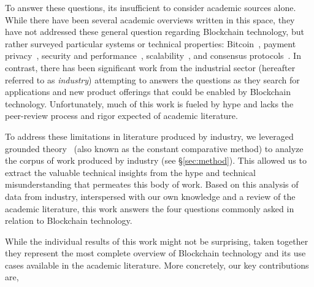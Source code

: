 To answer these questions, its insufficient to consider academic sources alone.
While there have been several academic overviews written in this space, they have not addressed these general question regarding Blockchain technology, but rather surveyed particular systems or technical properties: Bitcoin~\cite{BMC+15,Narayanan17}, payment privacy~\cite{Conti17}, security and performance~\cite{Gervais16}, scalability~\cite{Croman16}, and consensus protocols~\cite{Bano17,garay2018consensus}.
In contrast, there has been significant work from the industrial sector (hereafter referred to as \emph{industry}) attempting to answers the questions as they search for applications and new product offerings that could be enabled by Blockchain technology.
Unfortunately, much of this work is fueled by hype and lacks the peer-review process and rigor expected of academic literature.

To address these limitations in literature produced by industry, we leveraged grounded theory~\cite{glaser1965constant,strauss1990basics,corbin1990grounded} (also known as the constant comparative method) to analyze the corpus of work produced by industry (see \S\ref{sec:method}).
This allowed us to extract the valuable technical insights from the hype and technical misunderstanding that permeates this body of work.
Based on this analysis of data from industry, interspersed with our own knowledge and a review of the academic literature, this work answers the four questions commonly asked in relation to Blockchain technology.

While the individual results of this work might not be surprising, taken together they represent the most complete overview of Blockchain technology and its use cases available in the academic literature.
More concretely, our key contributions are,


